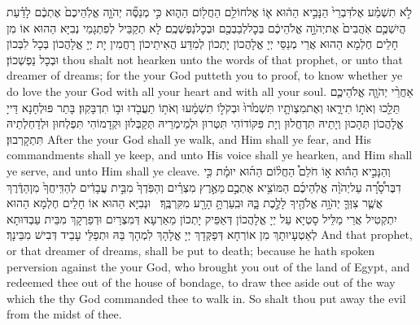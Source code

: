 {לֹ֣א תִשְׁמַ֗ע אֶל\maqqaf דִּבְרֵי֙ הַנָּבִ֣יא הַה֔וּא א֛וֹ אֶל\maqqaf חוֹלֵ֥ם הַחֲל֖וֹם הַה֑וּא כִּ֣י מְנַסֶּ֞ה יְהֹוָ֤ה אֱלֹֽהֵיכֶם֙ אֶתְכֶ֔ם לָדַ֗עַת הֲיִשְׁכֶ֤ם אֹֽהֲבִים֙ אֶת\maqqaf יְהֹוָ֣ה אֱלֹהֵיכֶ֔ם בְּכׇל\maqqaf לְבַבְכֶ֖ם וּבְכׇל\maqqaf נַפְשְׁכֶֽם׃}
{לָא תְקַבֵּיל לְפִתְגָמֵי נְבִיָּא הַהוּא אוֹ מִן חָלֵים חֶלְמָא הַהוּא אֲרֵי מְנַסֵּי יְיָ אֱלָהֲכוֹן יָתְכוֹן לְמִדַּע הֲאִיתֵיכוֹן רָחֲמִין יָת יְיָ אֱלָהֲכוֹן בְּכָל לִבְּכוֹן וּבְכָל נַפְשְׁכוֹן׃}
{thou shalt not hearken unto the words of that prophet, or unto that dreamer of dreams; for the \lord\space your God putteth you to proof, to know whether ye do love the \lord\space your God with all your heart and with all your soul.}{}
{אַחֲרֵ֨י יְהֹוָ֧ה אֱלֹהֵיכֶ֛ם תֵּלֵ֖כוּ וְאֹת֣וֹ תִירָ֑אוּ וְאֶת\maqqaf מִצְוֺתָ֤יו תִּשְׁמֹ֙רוּ֙ וּבְקֹל֣וֹ תִשְׁמָ֔עוּ וְאֹת֥וֹ תַעֲבֹ֖דוּ וּב֥וֹ תִדְבָּקֽוּן׃}
{בָּתַר פּוּלְחָנָא דַּייָ אֱלָהֲכוֹן תְּהָכוּן וְיָתֵיהּ תִּדְחֲלוּן וְיָת פִּקּוֹדוֹהִי תִּטְּרוּן וּלְמֵימְרֵיהּ תְּקַבְּלוּן וּקְדָמוֹהִי תִּפְלְחוּן וּלְדַחְלְתֵיהּ תִּתְקָרְבוּן׃}
{After the \lord\space your God shall ye walk, and Him shall ye fear, and His commandments shall ye keep, and unto His voice shall ye hearken, and Him shall ye serve, and unto Him shall ye cleave.}{}
{וְהַנָּבִ֣יא הַה֡וּא א֣וֹ חֹלֵם֩ הַחֲל֨וֹם הַה֜וּא יוּמָ֗ת כִּ֣י דִבֶּר\maqqaf סָ֠רָ֠ה עַל\maqqaf יְהֹוָ֨ה אֱלֹֽהֵיכֶ֜ם הַמּוֹצִ֥יא אֶתְכֶ֣ם \legarmeh  מֵאֶ֣רֶץ מִצְרַ֗יִם וְהַפֹּֽדְךָ֙ מִבֵּ֣ית עֲבָדִ֔ים לְהַדִּֽיחֲךָ֙ מִן\maqqaf הַדֶּ֔רֶךְ אֲשֶׁ֧ר צִוְּךָ֛ יְהֹוָ֥ה אֱלֹהֶ֖יךָ לָלֶ֣כֶת בָּ֑הּ וּבִֽעַרְתָּ֥ הָרָ֖ע מִקִּרְבֶּֽךָ׃ \setuma }
{וּנְבִיָּא הַהוּא אוֹ חָלֵים חֶלְמָא הַהוּא יִתְקְטִיל אֲרֵי מַלֵּיל סָטְיָא עַל יְיָ אֱלָהֲכוֹן דְּאַפֵּיק יָתְכוֹן מֵאַרְעָא דְּמִצְרַיִם וּדְפַרְקָךְ מִבֵּית עַבְדּוּתָא לְאַטְעָיוּתָךְ מִן אוֹרְחָא דְּפַקְּדָךְ יְיָ אֱלָהָךְ לִמְהָךְ בַּהּ וּתְפַלֵּי עָבֵיד דְּבִישׁ מִבֵּינָךְ׃}
{And that prophet, or that dreamer of dreams, shall be put to death; because he hath spoken perversion against the \lord\space your God, who brought you out of the land of Egypt, and redeemed thee out of the house of bondage, to draw thee aside out of the way which the \lord\space thy God commanded thee to walk in. So shalt thou put away the evil from the midst of thee.}{}
